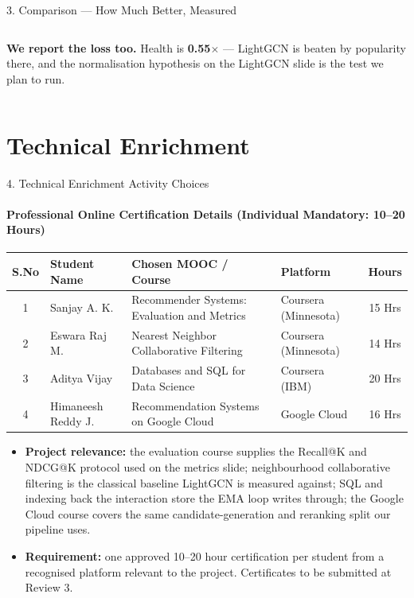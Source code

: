 \documentclass[aspectratio=169, 11pt]{beamer}
\begin{document}
\begin{frame}[shrink]{3. Comparison --- How Much Better, Measured}
\begin{columns}[T]
{\scriptsize\textbf{We report the loss too.} Health is \textbf{0.55$\times$} --- LightGCN is beaten by
popularity there, and the normalisation hypothesis on the LightGCN slide is the test we plan to run.}
\end{columns}
\end{frame}


\section{Technical Enrichment}

\begin{frame}[shrink]{4. Technical Enrichment Activity Choices}
\framesubtitle{Professional Online Certification Details (Individual Mandatory: 10--20 Hours)}
\vspace{2mm}
\begin{center}
{\footnotesize
\renewcommand{\arraystretch}{1.40}
\begin{tabular}{|c|p{2.7cm}|p{4.3cm}|p{2.5cm}|c|}
\hline
\textbf{S.No} & \textbf{Student Name} & \textbf{Chosen MOOC / Course} & \textbf{Platform} & \textbf{Hours}\\
\hline
1 & Sanjay A. K.       & Recommender Systems: Evaluation and Metrics & Coursera (Minnesota) & 15 Hrs\\
\hline
2 & Eswara Raj M.      & Nearest Neighbor Collaborative Filtering    & Coursera (Minnesota) & 14 Hrs\\
\hline
3 & Aditya Vijay       & Databases and SQL for Data Science         & Coursera (IBM)       & 20 Hrs\\
\hline
4 & Himaneesh Reddy J. & Recommendation Systems on Google Cloud     & Google Cloud         & 16 Hrs\\
\hline
\end{tabular}}
\end{center}
\vspace{3mm}
\begin{itemize}\scriptsize\setlength{\itemsep}{4pt}
  \item \textbf{Project relevance:} the evaluation course supplies the Recall@K and NDCG@K protocol
  used on the metrics slide; neighbourhood collaborative filtering is the classical baseline
  LightGCN is measured against; SQL and indexing back the interaction store the EMA loop writes
  through; the Google Cloud course covers the same candidate-generation and reranking split our
  pipeline uses.
  \item \textbf{Requirement:} one approved 10--20 hour certification per student from a recognised
  platform relevant to the project. Certificates to be submitted at Review 3.
\end{itemize}
\end{frame}
\end{document}
